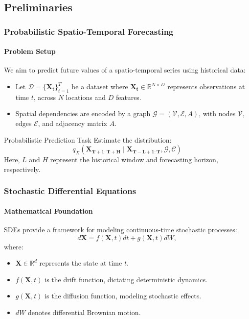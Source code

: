 \documentclass[light]{lutbeamer} %
\begin{document}
\subsection{Preliminaries}
\begin{frame}
    \frametitle{Probabilistic Spatio-Temporal Forecasting}
    \framesubtitle{Problem Setup}

    We aim to predict future values of a spatio-temporal series using historical data:
    \begin{itemize}
        \item Let \(\mathcal{D} = \{\mathbf{X_t}\}_{t=1}^T\) be a dataset where \(\mathbf{X_t} \in \mathbb{R}^{N \times D}\) represents observations at time \(t\), across \(N\) locations and \(D\) features.
        \item Spatial dependencies are encoded by a graph \(\mathcal{G} = (\mathcal{V}, \mathcal{E}, A)\), with nodes \(\mathcal{V}\), edges \(\mathcal{E}\), and adjacency matrix \(A\).
    \end{itemize}
    \begin{block}{Probabilistic Prediction Task}
        Estimate the distribution:
        \[
            q_X (\mathbf{X_{T+1:T+H}} \mid \mathbf{X_{T-L+1:T}}, \mathcal{G}, \mathcal{C})
        \]
        Here, \(L\) and \(H\) represent the historical window and forecasting horizon, respectively.
    \end{block}
\end{frame}


\begin{frame}
    \frametitle{Stochastic Differential Equations}
    \framesubtitle{Mathematical Foundation}

    SDEs provide a framework for modeling continuous-time stochastic processes:
    \begin{equation}
        d\mathbf{X} = f(\mathbf{X}, t)dt + g(\mathbf{X}, t)dW,
    \end{equation}
    where:
    \begin{itemize}
        \item \(\mathbf{X} \in \mathbb{R}^d\) represents the state at time \(t\).
        \item \(f(\mathbf{X}, t)\) is the drift function, dictating deterministic dynamics.
        \item \(g(\mathbf{X}, t)\) is the diffusion function, modeling stochastic effects.
        \item \(dW\) denotes differential Brownian motion.
    \end{itemize}
\end{frame}
\end{document}
